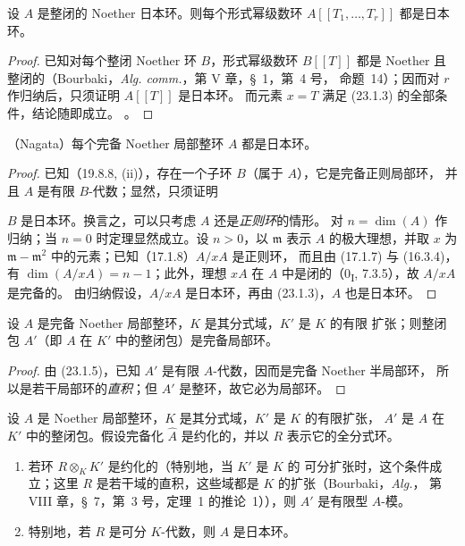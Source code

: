 \begin{corollary}[23.1.4]
\label{0.23.1.4-fr}
设 $A$ 是整闭的 Noether 日本环。则每个形式幂级数环
$A[[T_1,\ldots,T_r]]$ 都是日本环。
\end{corollary}

\begin{proof}
已知对每个整闭 Noether 环 $B$，形式幂级数环 $B[[T]]$ 都是 Noether
且整闭的（Bourbaki，\emph{Alg. comm.}，第 V 章，§~1，第~4 号，
命题~14）；因而对 $r$ 作归纳后，只须证明 $A[[T]]$ 是日本环。
而元素 $x=T$ 满足 (23.1.3) 的全部条件，结论随即成立。
。
\end{proof}

\begin{theorem}[23.1.5]
\label{0.23.1.5-fr}
\textnormal{（Nagata）}每个完备 Noether 局部整环 $A$ 都是日本环。
\end{theorem}

\begin{proof}
已知（19.8.8, (ii)），存在一个子环 $B$（属于 $A$），它是完备正则局部环，
并且 $A$ 是有限 $B$-代数；显然，只须证明


$B$ 是日本环。换言之，可以只考虑 $A$ 还是\emph{正则环}的情形。
对 $n=\dim(A)$ 作归纳；当 $n=0$ 时定理显然成立。设 $n>0$，以
$\mathfrak m$ 表示 $A$ 的极大理想，并取 $x$ 为
$\mathfrak m-\mathfrak m^2$ 中的元素；已知（17.1.8）$A/xA$ 是正则环，
而且由 (17.1.7) 与 (16.3.4)，有 $\dim(A/xA)=n-1$；此外，理想 $xA$
在 $A$ 中是闭的（0\textsubscript{I}, 7.3.5），故 $A/xA$ 是完备的。
由归纳假设，$A/xA$ 是日本环，再由 (23.1.3)，$A$ 也是日本环。
\end{proof}

\begin{corollary}[23.1.6]
\label{0.23.1.6-fr}
设 $A$ 是完备 Noether 局部整环，$K$ 是其分式域，$K'$ 是 $K$ 的有限
扩张；则整闭包 $A'$（即 $A$ 在 $K'$ 中的整闭包）是完备局部环。
\end{corollary}

\begin{proof}
由 (23.1.5)，已知 $A'$ 是有限 $A$-代数，因而是完备 Noether 半局部环，
所以是若干局部环的\emph{直积}；但 $A'$ 是整环，故它必为局部环。
\end{proof}

\begin{proposition}[23.1.7]
\label{0.23.1.7-fr}
设 $A$ 是 Noether 局部整环，$K$ 是其分式域，$K'$ 是 $K$ 的有限扩张，
$A'$ 是 $A$ 在 $K'$ 中的整闭包。假设完备化 $\widehat A$ 是约化的，并以
$R$ 表示它的全分式环。
\begin{enumerate}
  \item[(i)] 若环 $R\otimes_KK'$ 是约化的（特别地，当 $K'$ 是 $K$ 的
  可分扩张时，这个条件成立；这里 $R$
  是若干域的直积，这些域都是 $K$ 的扩张（Bourbaki，\emph{Alg.}，
  第 VIII 章，§~7，第~3 号，定理~1 的推论~1）），则 $A'$ 是有限型
  $A$-模。
  \item[(ii)] 特别地，若 $R$ 是可分 $K$-代数，则 $A$ 是日本环。
\end{enumerate}
\end{proposition}

